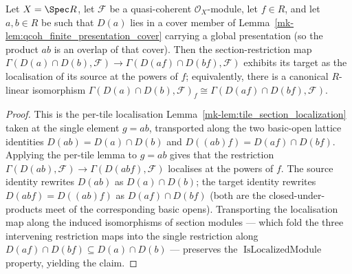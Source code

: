 \begin{lemma}
  \label{mk-lem:overlap_section_localization}

  Let \(X = \Spec R\), let \(\mathcal{F}\) be a quasi-coherent \(\mathcal{O}_X\)-module, let \(f \in R\),
  and let \(a, b \in R\) be such that \(D(a)\) lies in a cover member of
  Lemma~\ref{mk-lem:qcoh_finite_presentation_cover} carrying a global presentation (so the product \(a b\) is
  an overlap of that cover). Then the section-restriction map
  \(\Gamma(D(a) \cap D(b), \mathcal{F}) \to \Gamma(D(af) \cap D(bf), \mathcal{F})\) exhibits its target as
  the localisation of its source at the powers of \(f\); equivalently, there is a canonical \(R\)-linear
  isomorphism \(\Gamma(D(a) \cap D(b), \mathcal{F})_f \cong \Gamma(D(af) \cap D(bf), \mathcal{F})\).
\end{lemma}
\begin{proof}
  This is the per-tile localisation Lemma~\ref{mk-lem:tile_section_localization} taken at the single element
  \(g = a b\), transported along the two basic-open lattice identities \(D(ab) = D(a) \cap D(b)\) and
  \(D((ab)f) = D(af) \cap D(bf)\). Applying the per-tile lemma to \(g = a b\) gives that the restriction
  \(\Gamma(D(ab), \mathcal{F}) \to \Gamma(D(abf), \mathcal{F})\) localises at the powers of \(f\). The
  source identity rewrites \(D(ab)\) as \(D(a) \cap D(b)\); the target identity rewrites \(D(abf) =
  D((ab)f)\) as \(D(af) \cap D(bf)\) (both are the closed-under-products meet of the corresponding basic
  opens). Transporting the localisation map along the induced isomorphisms of section modules — which
  fold the three intervening restriction maps into the single restriction along
  \(D(af) \cap D(bf) \subseteq D(a) \cap D(b)\) — preserves the
  \(\operatorname{IsLocalizedModule}\) property, yielding the claim.
\end{proof}

